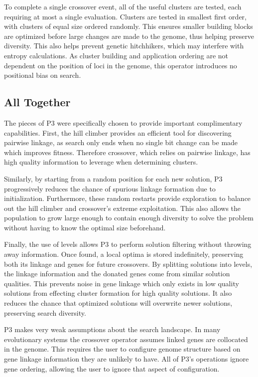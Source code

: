 \documentclass{sig-alternate}
\begin{document}
To complete a single crossover event, all of the useful clusters are tested, each
requiring at most a single evaluation.  Clusters are tested in smallest first order,
with clusters of equal size ordered randomly.  This ensures smaller building blocks
are optimized before large changes are made to the genome, thus helping preserve
diversity.  This also helps prevent genetic hitchhikers, which may interfere with
entropy calculations.  As cluster building and application ordering are not dependent on
the position of loci in the genome, this operator introduces no positional bias on search.

\subsection{All Together}
\label{sec-alltogether}
The pieces of P3 were specifically chosen to provide important complimentary capabilities.  First,
the hill climber provides an efficient tool for discovering pairwise linkage, as
search only ends when no single bit change can be made which improves fitness.
Therefore crossover, which relies on pairwise linkage, has high quality information
to leverage when determining clusters.

Similarly, by starting from a random position for each new solution, P3 progressively reduces
the chance of spurious linkage formation due to initialization.  Furthermore, these random
restarts provide exploration to balance out the hill climber and crossover's extreme
exploitation.  This also allows the population to grow large enough to contain enough
diversity to solve the problem without having to know the optimal size beforehand.

Finally, the use of levels allows P3 to perform solution filtering
without throwing away information.  Once found, a local optima is
stored indefinitely, preserving both its linkage and genes for future
crossovers.  By splitting solutions into levels, the linkage
information and the donated genes come from similar solution
qualities.  This prevents noise in gene linkage which only exists in
low quality solutions from effecting cluster formation for high
quality solutions.  It also reduces the chance that optimized
solutions will overwrite newer solutions, preserving
search diversity.

P3 makes very weak
assumptions about the search landscape.  In many evolutionary
systems the crossover operator assumes linked genes
are collocated in the genome.  This requires the user
to configure genome structure based on gene linkage information they
are unlikely to have. All of
P3's operations ignore gene ordering, allowing the user to ignore
that aspect of configuration.
\end{document}
